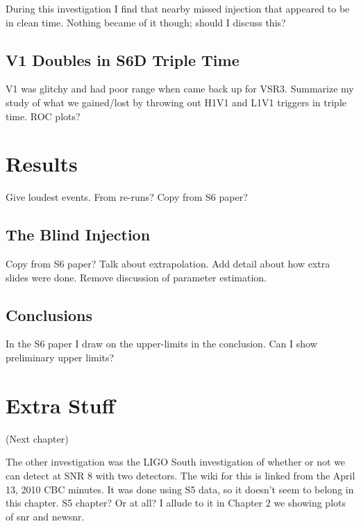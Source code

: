 During this investigation I find that nearby missed injection that appeared to be in clean time. Nothing became of it though; should I discuss this?

\subsection{V1 Doubles in S6D Triple Time}

V1 was glitchy and had poor range when came back up for VSR3. Summarize my study of what we gained/lost by throwing out H1V1 and L1V1 triggers in triple time. ROC plots? 

\section{Results}

Give loudest events. From re-runs? Copy from S6 paper?

\subsection{The Blind Injection}

Copy from S6 paper? Talk about extrapolation. Add detail about how extra slides were done. Remove discussion of parameter estimation.

\subsection{Conclusions}

In the S6 paper I draw on the upper-limits in the conclusion. Can I show preliminary upper limits?

\section{Extra Stuff}

(Next chapter)

The other investigation was the LIGO South investigation of whether or not we can detect at SNR 8 with two detectors. The wiki for this is linked from the April 13, 2010 CBC minutes. It was done using S5 data, so it doesn't seem to belong in this chapter. S5 chapter? Or at all? I allude to it in Chapter 2 we showing plots of snr and newsnr.

